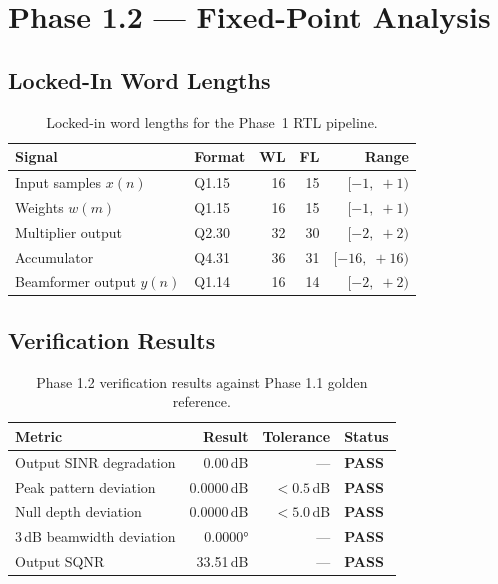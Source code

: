 \documentclass[11pt,a4paper]{article}
\begin{document}
\section{Phase 1.2 --- Fixed-Point Analysis}

\subsection{Locked-In Word Lengths}

\begin{table}[H]
\centering
\begin{tabular}{llrrr}
\toprule
\textbf{Signal} & \textbf{Format} & \textbf{WL} & \textbf{FL} & \textbf{Range} \\
\midrule
Input samples $x(n)$     & Q1.15 & 16 & 15 & $[-1,\;+1)$ \\
Weights $w(m)$           & Q1.15 & 16 & 15 & $[-1,\;+1)$ \\
Multiplier output        & Q2.30 & 32 & 30 & $[-2,\;+2)$ \\
Accumulator              & Q4.31 & 36 & 31 & $[-16,\;+16)$ \\
Beamformer output $y(n)$ & Q1.14 & 16 & 14 & $[-2,\;+2)$ \\
\bottomrule
\end{tabular}
\caption{Locked-in word lengths for the Phase~1 RTL pipeline.}
\end{table}

\subsection{Verification Results}

\begin{table}[H]
\centering
\begin{tabular}{lrrl}
\toprule
\textbf{Metric} & \textbf{Result} & \textbf{Tolerance} & \textbf{Status} \\
\midrule
Output SINR degradation   & 0.00\,dB   & ---        & \textcolor{passgreen}{\textbf{PASS}} \\
Peak pattern deviation    & 0.0000\,dB & $<0.5$\,dB & \textcolor{passgreen}{\textbf{PASS}} \\
Null depth deviation      & 0.0000\,dB & $<5.0$\,dB & \textcolor{passgreen}{\textbf{PASS}} \\
3\,dB beamwidth deviation & 0.0000°    & ---        & \textcolor{passgreen}{\textbf{PASS}} \\
Output SQNR               & 33.51\,dB  & ---        & \textcolor{passgreen}{\textbf{PASS}} \\
\bottomrule
\end{tabular}
\caption{Phase 1.2 verification results against Phase 1.1 golden reference.}
\end{table}
\end{document}

